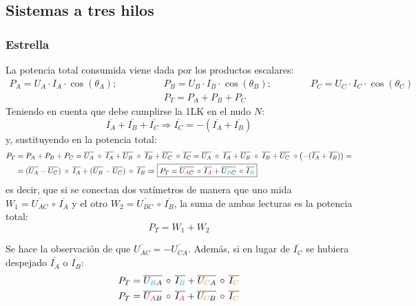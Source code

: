 \documentclass[11pt]{book} %
\begin{document}
	\subsection{Sistemas a tres hilos}\label{sec.potencia_3H}
	
	\subsubsection{Estrella}
	
	La potencia total consumida viene dada por los productos escalares: 
	\begin{align*}
	    P_A=U_{A}\cdot I_A \cdot \cos(\theta_A);\qquad \qquad
	    &P_B=U_{B}\cdot I_B \cdot \cos(\theta_B);\qquad \qquad
	    P_C=U_{C}\cdot I_C \cdot \cos(\theta_C)\\
	    &P_T=P_A+P_B+P_C
	\end{align*}
	Teniendo en cuenta que debe cumplirse la 1LK en el nudo $N$:
	\begin{equation*}
	    \overline{I_A}+\overline{I_B}+\overline{I_C}\Rightarrow \overline{I_C}=-(\overline{I_A}+\overline{I_B})
	\end{equation*}
	y, sustituyendo en la potencia total: 
	\begin{align}
	    P_T&=P_A+P_B+P_C=\overline{U_{A}}\;\circ\; \overline{I_A} + \overline{U_{B}}\;\circ\; \overline{I_B} + \overline{U_{C}}\;\circ\,\overline{I_C}=\overline{U_{A}}\;\circ\; \overline{I_A}+\overline{U_{B}}\;\circ\; \overline{I_B}+\overline{U_{C}}\;\circ\left(-(\overline{I_A}+\overline{I_B})\right)=\nonumber \\
	    & =(\overline{U_A}-\overline{U_C})\;\circ\; \overline{I_A}+(\overline{U_B}-\overline{U_C})\;\circ\; \overline{I_B}\Rightarrow \boxed{P_T=\overline{U_{\textcolor{red}{A}C}}\,\circ\,\overline{I_{\textcolor{red}{A}}}+\overline{U_{\textcolor{cyan}{B}C}}\,\circ\,\overline{I_{\textcolor{cyan}{B}}}}
	\end{align}
	es decir, que si se conectan dos vatímetros de manera que uno mida $W_1=\overline{U_{AC}}\,\circ\,\overline{I_A}$ y el otro $W_2=\overline{U_{BC}}\,\circ\,\overline{I_B}$, la suma de ambas lecturas es la potencia total: 
	\begin{equation*}
	    P_T=W_1+W_2
	\end{equation*}
	\begin{remark}
	    Se hace la observación de que $\overline{U_{AC}}=-\overline{U_{CA}}$. Además, si en lugar de $\overline{I_C}$ se hubiera despejado $\overline{I_A}$ o $\overline{I_B}$:
	    \begin{align*}
	        P_T&=\overline{U_{\textcolor{cyan}{B}A}}\,\circ\,\overline{I_{\textcolor{cyan}{B}}}+\overline{U_{\textcolor{orange}{C}A}}\,\circ\,\overline{I_{\textcolor{orange}{C}}}\\
	        P_T&=\overline{U_{\textcolor{red}{A}B}}\,\circ\,\overline{I_{\textcolor{red}{A}}}+\overline{U_{\textcolor{orange}{C}B}}\,\circ\,\overline{I_{\textcolor{orange}{C}}}
	    \end{align*}
	\end{remark}
	
\end{document}
